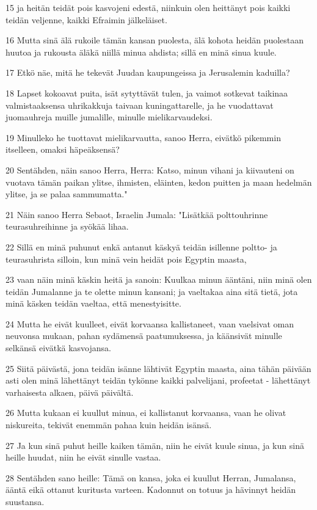 \par 15 ja heitän teidät pois kasvojeni edestä, niinkuin olen heittänyt pois kaikki teidän veljenne, kaikki Efraimin jälkeläiset.
\par 16 Mutta sinä älä rukoile tämän kansan puolesta, älä kohota heidän puolestaan huutoa ja rukousta äläkä niillä minua ahdista; sillä en minä sinua kuule.
\par 17 Etkö näe, mitä he tekevät Juudan kaupungeissa ja Jerusalemin kaduilla?
\par 18 Lapset kokoavat puita, isät sytyttävät tulen, ja vaimot sotkevat taikinaa valmistaaksensa uhrikakkuja taivaan kuningattarelle, ja he vuodattavat juomauhreja muille jumalille, minulle mielikarvaudeksi.
\par 19 Minulleko he tuottavat mielikarvautta, sanoo Herra, eivätkö pikemmin itselleen, omaksi häpeäksensä?
\par 20 Sentähden, näin sanoo Herra, Herra: Katso, minun vihani ja kiivauteni on vuotava tämän paikan ylitse, ihmisten, eläinten, kedon puitten ja maan hedelmän ylitse, ja se palaa sammumatta."
\par 21 Näin sanoo Herra Sebaot, Israelin Jumala: "Lisätkää polttouhrinne teurasuhreihinne ja syökää lihaa.
\par 22 Sillä en minä puhunut enkä antanut käskyä teidän isillenne poltto- ja teurasuhrista silloin, kun minä vein heidät pois Egyptin maasta,
\par 23 vaan näin minä käskin heitä ja sanoin: Kuulkaa minun ääntäni, niin minä olen teidän Jumalanne ja te olette minun kansani; ja vaeltakaa aina sitä tietä, jota minä käsken teidän vaeltaa, että menestyisitte.
\par 24 Mutta he eivät kuulleet, eivät korvaansa kallistaneet, vaan vaelsivat oman neuvonsa mukaan, pahan sydämensä paatumuksessa, ja käänsivät minulle selkänsä eivätkä kasvojansa.
\par 25 Siitä päivästä, jona teidän isänne lähtivät Egyptin maasta, aina tähän päivään asti olen minä lähettänyt teidän tykönne kaikki palvelijani, profeetat - lähettänyt varhaisesta alkaen, päivä päivältä.
\par 26 Mutta kukaan ei kuullut minua, ei kallistanut korvaansa, vaan he olivat niskureita, tekivät enemmän pahaa kuin heidän isänsä.
\par 27 Ja kun sinä puhut heille kaiken tämän, niin he eivät kuule sinua, ja kun sinä heille huudat, niin he eivät sinulle vastaa.
\par 28 Sentähden sano heille: Tämä on kansa, joka ei kuullut Herran, Jumalansa, ääntä eikä ottanut kuritusta varteen. Kadonnut on totuus ja hävinnyt heidän suustansa.
